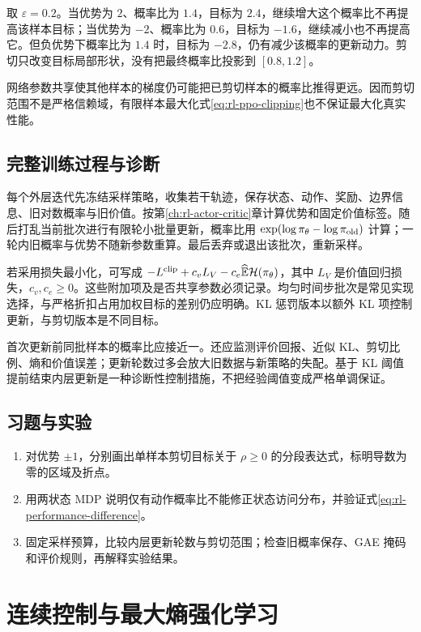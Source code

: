 \documentclass[UTF8,12pt,a4paper,fontset=fandol]{ctexbook}
\begin{document}
\begin{example}[剪切并非硬约束]
取 $\varepsilon=0.2$。当优势为 $2$、概率比为 $1.4$，目标为 $2.4$，继续增大这个概率比不再提高该样本目标；当优势为 $-2$、概率比为 $0.6$，目标为 $-1.6$，继续减小也不再提高它。但负优势下概率比为 $1.4$ 时，目标为 $-2.8$，仍有减少该概率的更新动力。剪切只改变目标局部形状，没有把最终概率比投影到 $[0.8,1.2]$。
\end{example}

网络参数共享使其他样本的梯度仍可能把已剪切样本的概率比推得更远。因而剪切范围不是严格信赖域，有限样本最大化式\eqref{eq:rl-ppo-clipping}也不保证最大化真实性能。

\section{完整训练过程与诊断}

每个外层迭代先冻结采样策略，收集若干轨迹，保存状态、动作、奖励、边界信息、旧对数概率与旧价值。按第\ref{ch:rl-actor-critic}章计算优势和固定价值标签。随后打乱当前批次进行有限轮小批量更新，概率比用 $\exp(\log\pi_\theta-\log\pi_{\rm old})$ 计算；一轮内旧概率与优势不随新参数重算。最后丢弃或退出该批次，重新采样。

若采用损失最小化，可写成 $-L^{\rm clip}+c_vL_V-c_e\widehat{\mathbb E}\mathcal H(\pi_\theta)$，其中 $L_V$ 是价值回归损失，$c_v,c_e\geq0$。这些附加项及是否共享参数必须记录。均匀时间步批次是常见实现选择，与严格折扣占用加权目标的差别仍应明确。KL 惩罚版本以额外 KL 项控制更新，与剪切版本是不同目标。

首次更新前同批样本的概率比应接近一。还应监测评价回报、近似 KL、剪切比例、熵和价值误差；更新轮数过多会放大旧数据与新策略的失配。基于 KL 阈值提前结束内层更新是一种诊断性控制措施，不把经验阈值变成严格单调保证。

\section{习题与实验}
\begin{enumerate}
\item 对优势 $\pm1$，分别画出单样本剪切目标关于 $\rho\geq0$ 的分段表达式，标明导数为零的区域及折点。
\item 用两状态 MDP 说明仅有动作概率比不能修正状态访问分布，并验证式\eqref{eq:rl-performance-difference}。
\item 固定采样预算，比较内层更新轮数与剪切范围；检查旧概率保存、GAE 掩码和评价规则，再解释实验结果。
\end{enumerate}

\chapter{连续控制与最大熵强化学习}
\label{ch:rl-continuous}
\end{document}
